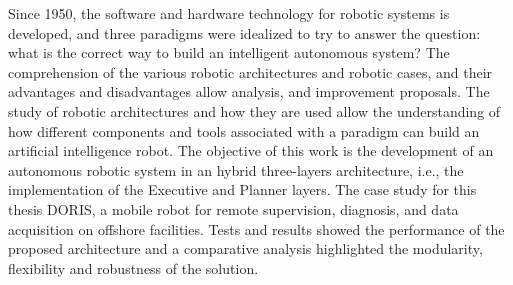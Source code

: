 \begin{foreignabstract}
\nohyphens{
Since 1950, the software and hardware technology for robotic systems is
developed, and three paradigms were idealized to try to answer the question: what
is the correct way to build an intelligent autonomous system? The comprehension
of the various robotic architectures and robotic cases, and their advantages and
disadvantages allow analysis, and improvement proposals. The study of robotic
architectures and how they are used allow the understanding of how different
components and tools associated with a paradigm can build an artificial intelligence
robot. The objective of this work is the development of an autonomous robotic
system in an hybrid three-layers architecture, i.e., the implementation of the
Executive and Planner layers. The case study for this thesis DORIS, a mobile robot
for remote supervision, diagnosis, and data acquisition on offshore facilities. Tests
and results showed the performance of the proposed architecture and a comparative
analysis highlighted the modularity, flexibility and robustness of the solution.
}

\end{foreignabstract}


